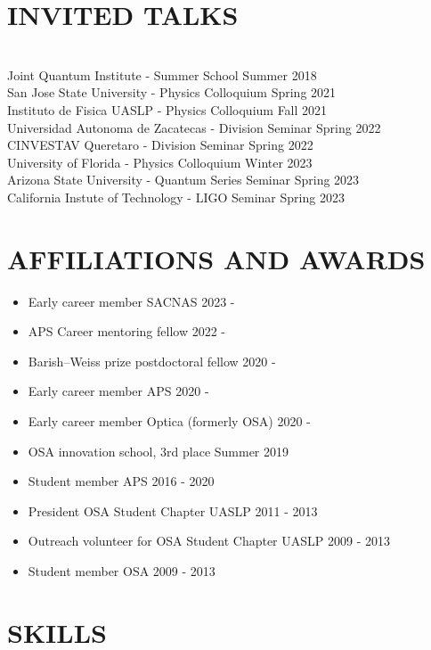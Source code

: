 \documentclass[margin]{res} %
\begin{document}
\begin{resume}
\section{INVITED TALKS}
\hfill \\
{Joint Quantum Institute - Summer School \hfill Summer 2018}\\
{San Jose State University - Physics Colloquium \hfill Spring 2021}\\
{Instituto de Fisica UASLP - Physics Colloquium \hfill Fall 2021}\\
{Universidad Autonoma de Zacatecas - Division Seminar \hfill Spring 2022}\\
{CINVESTAV Queretaro - Division Seminar \hfill Spring 2022}\\
{University of Florida - Physics Colloquium \hfill Winter 2023}\\
{Arizona State University - Quantum Series Seminar \hfill Spring 2023}\\
{California Instute of Technology - LIGO Seminar \hfill Spring 2023}
\section{AFFILIATIONS AND AWARDS}
 
\begin{itemize}
    \item{Early career member SACNAS \hfill 2023 -}
    \item{APS Career mentoring fellow \hfill 2022 -}
    \item{Barish--Weiss prize postdoctoral fellow \hfill 2020 -}
    \item{Early career member APS \hfill 2020 -}
    \item{Early career member Optica (formerly OSA) \hfill 2020 -}
    \item{OSA innovation school, 3rd place \hfill Summer 2019}
    \item{Student member APS \hfill 2016 - 2020}
    \item{President OSA Student Chapter UASLP \hfill 2011 - 2013}
    \item{Outreach volunteer for OSA Student Chapter UASLP \hfill 2009 - 2013}
    \item{Student member OSA \hfill 2009 - 2013}
\end{itemize}

\section{SKILLS}


\end{resume}
\end{document}
